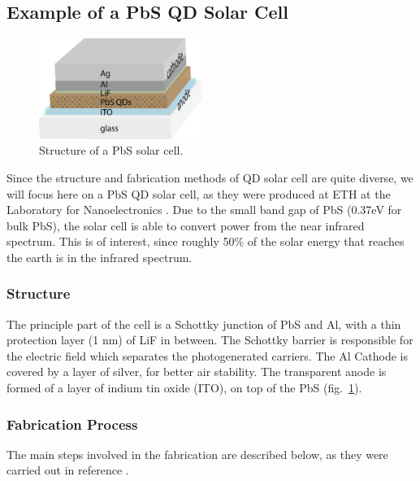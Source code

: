 \subsection{Example of a PbS QD Solar Cell}


\begin{figure}
	\centering
	\includegraphics[width=200px]{Fig/SolarCell/PbSsolarCellStructure}
	\caption{Structure of a PbS solar cell.}
	\label{fig:PbSsolarCellStructure}
\end{figure}


Since the structure and fabrication methods of QD solar cell are quite diverse, we will focus here on a PbS QD solar cell, as they were produced at ETH at the Laboratory for Nanoelectronics \cite{MS_Michael}. Due to the small band gap of PbS (0.37eV for bulk PbS), the solar cell is able to convert power from the near infrared spectrum. This is of interest, since roughly 50\% of the solar energy that reaches the earth is in the infrared spectrum.

\subsubsection{Structure}

The principle part of the cell is a Schottky junction of PbS and Al, with a thin protection layer (1 nm) of LiF in between. The Schottky barrier is responsible for the electric field which separates the photogenerated carriers. The Al Cathode is covered by a layer of silver, for better air stability. The transparent anode is formed of a layer of indium tin oxide (ITO), on top of the PbS (fig.~\ref{fig:PbSsolarCellStructure}).

\subsubsection{Fabrication Process}

The main steps involved in the fabrication are described below, as they were carried out in reference \cite[pp. 13-19]{MS_Michael}.

